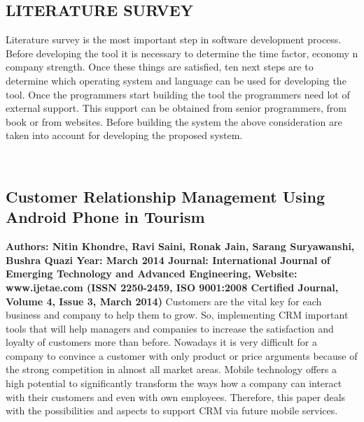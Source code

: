 \documentclass[12pt,a4paper]{article}
\begin{document}

\newpage
\begin{center}
\section{LITERATURE SURVEY}
\end{center}
\pagestyle{plain} 
\hspace{0.7cm}Literature survey is the most important step in software development process. Before developing the tool it is necessary to determine the time factor, economy n company strength. Once these things are satisfied, ten next steps are to determine which operating system and language can be used for developing the tool. Once the programmers start building the tool the programmers need lot of external support. This support can be obtained from senior programmers, from book or from websites. Before building the system the above consideration are taken into account for developing the proposed system.

\\
\subsection{Customer Relationship Management Using Android Phone in Tourism}
\textbf{Authors:	Nitin Khondre, Ravi Saini, Ronak Jain, 
Sarang Suryawanshi, Bushra Quazi
	Year:		March 2014
Journal: 	International Journal of Emerging Technology and         Advanced Engineering,
	Website: www.ijetae.com (ISSN 2250-2459, ISO 9001:2008 Certified Journal, Volume 4, Issue 3, March 2014)
}
Customers are the vital key for each business and company to help them to grow. So, implementing CRM important tools that will help managers and companies to increase the satisfaction and loyalty of customers more than before. Nowadays it is very difficult for a company to convince a customer with only product or price arguments because of the strong competition in almost all market areas. Mobile technology offers a high potential to significantly transform the ways how a company can interact with their customers and even with own employees. Therefore, this paper deals with the possibilities and aspects to support CRM via future mobile services.
\\
\end{document}
